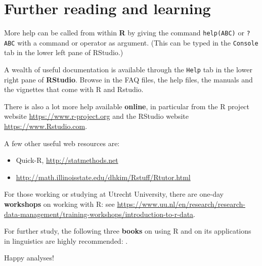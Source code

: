\documentclass[
]{book}
\begin{document}
\hypertarget{sec-furtherreading}{%
\chapter{Further reading and learning}\label{sec-furtherreading}}

More help can be called from within \textbf{R} by giving the command
\texttt{help(ABC)} or \texttt{?ABC} with a
command or operator as argument.
(This can be typed in the \texttt{Console} tab in the lower left pane of RStudio.)

A wealth of useful documentation is available through the \texttt{Help} tab
in the lower right pane of \textbf{RStudio}. Browse in the FAQ files, the help files, the
manuals and the vignettes that come with R and Rstudio.

There is also a lot more help available \textbf{online}, in particular
from the R project website \url{https://www.r-project.org}
and the RStudio website \url{https://www.Rstudio.com}.

A few other useful web resources are:

\begin{itemize}
\item
  Quick-R, \url{http://statmethods.net}
\item
  \url{http://math.illinoisstate.edu/dhkim/Rstuff/Rtutor.html}
\end{itemize}

For those working or studying at Utrecht University,
there are one-day \textbf{workshops} on working with R: see
\url{https://www.uu.nl/en/research/research-data-management/training-workshops/introduction-to-r-data}.

For further study, the following three \textbf{books} on using R and on its
applications in linguistics are highly recommended:
\citep{baay08, john08, adler10}.

Happy analyses!

  
\end{document}
